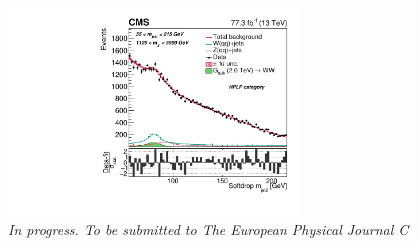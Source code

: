 \begin{singlespace}
\begin{centering}
\end{centering}
\begin{figure}[b!]
    \centering
    \includegraphics[height=5.5cm]{figures/analysis/search3/B2G-18-002/PostFitComboHPLP_Y-Proj__x___0_-1_z___0_-1.pdf}
    \vspace*{10mm}
    \caption*{\footnotesize{\textit{In progress. To be submitted to The European Physical Journal C}}}
\end{figure}
\end{singlespace}

\clearpage




